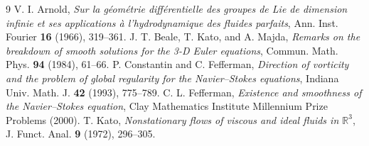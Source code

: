 \documentclass[11pt,reqno]{amsart}
\theoremstyle{definition}
\begin{document}
\begin{thebibliography}{9}
 V. I. Arnold, \emph{Sur la géométrie différentielle des groupes de Lie de dimension infinie et ses applications à l'hydrodynamique des fluides parfaits}, Ann. Inst. Fourier \textbf{16} (1966), 319--361.
 J. T. Beale, T. Kato, and A. Majda, \emph{Remarks on the breakdown of smooth solutions for the 3-D Euler equations}, Commun. Math. Phys. \textbf{94} (1984), 61--66.
 P. Constantin and C. Fefferman, \emph{Direction of vorticity and the problem of global regularity for the Navier--Stokes equations}, Indiana Univ. Math. J. \textbf{42} (1993), 775--789.
 C. L. Fefferman, \emph{Existence and smoothness of the Navier--Stokes equation}, Clay Mathematics Institute Millennium Prize Problems (2000).
 T. Kato, \emph{Nonstationary flows of viscous and ideal fluids in $\mathbb{R}^3$}, J. Funct. Anal. \textbf{9} (1972), 296--305.
\end{thebibliography}
\end{document}
